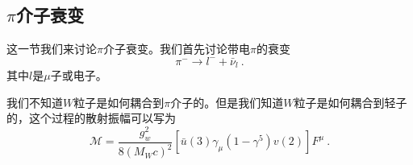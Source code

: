 
\subsection*{$\pi$介子衰变} 
这一节我们来讨论$\pi$介子衰变。我们首先讨论带电$\pi$的衰变 
\begin{equation}
\pi^- \rightarrow l^- + \bar \nu_l~.
\end{equation}
其中$l$是$\mu$子或电子。

我们不知道$W$粒子是如何耦合到$\pi$介子的。但是我们知道$W$粒子是如何耦合到轻子的，这个过程的散射振幅可以写为
\begin{equation}
\mathcal M = \frac{g_w^2}{8(M_W c)^2} [\bar u (3) \gamma_\mu (1-\gamma^5)v(2)] F^\mu~.
\end{equation}



